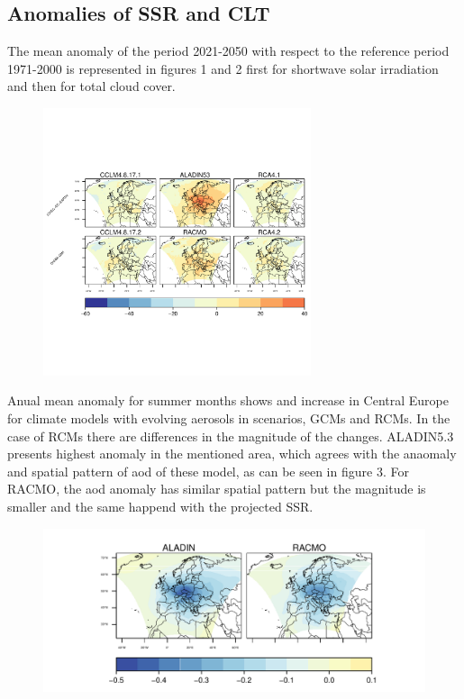 \subsection{Anomalies of SSR and CLT}

The mean anomaly of the period 2021-2050 with respect to the reference period 1971-2000 is represented in figures 1 and 2 first for shortwave solar irradiation and then for total cloud cover.\\

\begin{figure}[h!]
\centering\includegraphics[width=0.7\textwidth]{figs/capitulo7/ANOMALIAS_JJA_SSR_2050-2021.pdf}
\caption{}
\label{}
\end{figure}

Anual mean anomaly for summer months shows and increase in Central Europe for climate models with evolving aerosols in scenarios, GCMs and RCMs. In the case of RCMs there are differences in the magnitude of the changes. ALADIN5.3 presents highest anomaly in the mentioned area, which agrees with the anaomaly and spatial pattern of aod of these model, as can be seen in figure 3. For RACMO, the aod anomaly has similar spatial pattern but the magnitude is smaller and the same happend with the projected SSR.\\

\begin{figure}[h!]
\centering\includegraphics[width=1\textwidth]{figs/capitulo7/ANOMALIAS_JJA_AOD_2050-2021.pdf}
\caption{}
\label{}
\end{figure}

% 